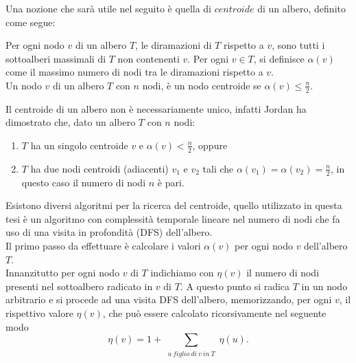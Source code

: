 Una nozione che sarà utile nel seguito è quella di $ centroide $ di un albero, definito come segue:

\begin{definizione}
Per ogni nodo $ v $ di un albero $ T $, le diramazioni di $ T $  rispetto a $ v $, sono tutti i sottoalberi massimali di $ T $ non contenenti $ v $. 
Per ogni $ v \in T $, si definisce $\alpha(v)$ come il massimo numero di nodi tra le diramazioni rispetto a $ v $.\\ 
Un nodo $ v $ di un albero $ T $ con $ n $ nodi, \`e un nodo centroide se $\alpha(v)\le\frac{n}{2}$.
\end{definizione}

Il centroide di un albero non \`e necessariamente unico, infatti Jordan \cite{jordan1869assemblages}  ha dimostrato che, dato un albero $ T $ con $ n $ nodi:
\begin{enumerate}
	\renewcommand{\labelenumi}{\roman{enumi}}
	\item $ T $ ha un singolo centroide $ v $ e $\alpha(v) < \frac{n}{2}$, oppure
	\item$ T $ ha due nodi centroidi (adiacenti) $v_1$ e $v_2$ tali che $\alpha(v_1) = \alpha(v_2) = \frac{n}{2}$, in questo caso il numero di nodi $ n $ \`e pari.
\end{enumerate}

Esistono diversi algoritmi per la ricerca del centroide, quello utilizzato in questa tesi \`e un algoritmo con complessit\`a temporale lineare nel numero di nodi che fa uso di una visita in profondità (DFS) dell'albero. \\
Il primo passo da effettuare \`e calcolare i valori $\alpha(v)$ per ogni nodo $ v$ dell'albero $T$.\\
Innanzitutto per ogni nodo $v$ di $T $ indichiamo con $ \eta(v) $ il numero di nodi presenti nel sottoalbero radicato in $ v $ di $ T $.
A questo punto si radica $T$ in un nodo arbitrario e si procede ad una visita DFS dell'albero, memorizzando, per ogni $v$, il rispettivo valore $ \eta(v) $, che può essere calcolato ricorsivamente nel seguente modo 
\begin{equation}
\label{eq:eta_centroide}
\eta(v) = 1 + \sum_{\substack{u \ figlio \ di \ v \ in \ T} } { \eta(u)}.
\end{equation}

